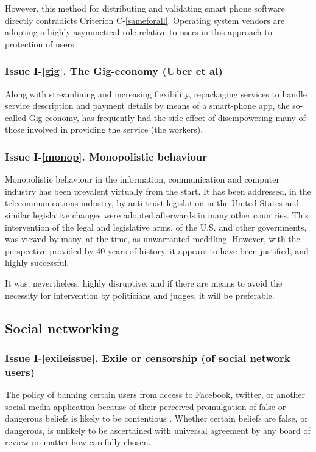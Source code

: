 However, this method for distributing and validating smart phone software
directly contradicts Criterion C-\ref{sameforall}. Operating system vendors
are adopting a highly asymmetical role relative to users in this approach
to protection of users. 

\subsubsection*{Issue I-\ref{gig}. {The Gig-economy (Uber et al)}}\label{gigsol}
%
Along with streamlining and increasing flexibility, repackaging services to handle
service description and payment details by means of a smart-phone app, 
the so-called Gig-economy, has frequently had the side-effect of
disempowering many of those involved in providing the service (the workers).

\subsubsection*{Issue I-\ref{monop}. {Monopolistic behaviour}}\label{monopsol}
%
Monopolistic behaviour in the information, communication and computer industry
has been prevalent virtually from the start. It has been addressed, in the
telecommunications industry, by anti-trust legislation in the United States
and similar legislative changes were adopted afterwards in many other countries.
This intervention of the legal and legislative arms, of the U.S. and other
governments, was viewed by many, at the time, as unwarranted meddling. However,
with the perspective provided by 40 years of history, it appears to have been
justified, and highly successful.

It was, nevertheless, highly disruptive, and if there are means to avoid
the necessity for intervention by politicians and judges, it will be preferable.


\subsection{Social networking}\label{evolution}

\subsubsection*{Issue I-\ref{exileissue}. {Exile or censorship (of social network users)}}\label{exile}
%
The policy of banning certain users from access to Facebook, twitter, or another social
media application because of their perceived promulgation of false or dangerous beliefs
is likely to be contentious \cite{parameswaran2007social}. Whether certain beliefs are false, or dangerous, is unlikely
to be ascertained with universal agreement by any board of review no matter how carefully
chosen.

